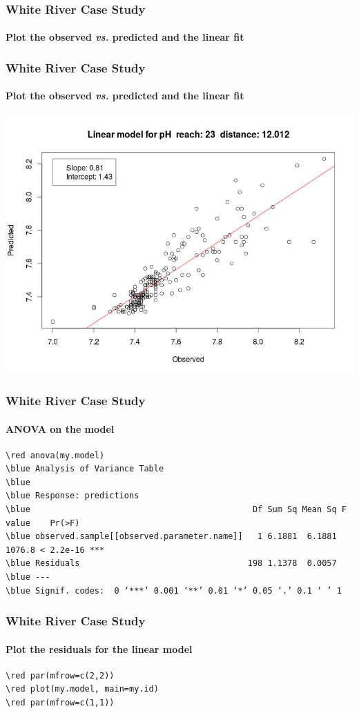\documentclass[10pt]{beamer}
\newcommand{\red}{\color{red}}
\newcommand{\blue}{\color{blue}}
\newcommand{\iwsframe}[2]{
\begin{frame}[fragile]
\frametitle{#1}
\framesubtitle{#2}
}
\begin{document}
\iwsframe{White River Case Study}{Plot the observed {\em vs.}
  predicted and the linear fit}
\VerbatimInput[formatcom=\red,fontsize=\scriptsize,firstline=205,lastline=214]{whiteriver01.r}
\end{frame}

\iwsframe{White River Case Study}{Plot the observed {\em vs.}
  predicted and the linear fit}
\includegraphics[width=\textwidth]{whiteriverplot05.png}
\end{frame}


\iwsframe{White River Case Study}{ANOVA on the model}
\begin{Verbatim}[fontsize=\scriptsize,commandchars=\\\{\}]
\red anova(my.model)
\blue Analysis of Variance Table
\blue 
\blue Response: predictions
\blue                                             Df Sum Sq Mean Sq F value    Pr(>F)    
\blue observed.sample[[observed.parameter.name]]   1 6.1881  6.1881  1076.8 < 2.2e-16 ***
\blue Residuals                                  198 1.1378  0.0057                      
\blue ---
\blue Signif. codes:  0 ‘***’ 0.001 ‘**’ 0.01 ‘*’ 0.05 ‘.’ 0.1 ‘ ’ 1
\end{Verbatim}
\end{frame}

\iwsframe{White River Case Study}{Plot the residuals for the linear model}
\begin{Verbatim}[fontsize=\scriptsize,commandchars=\\\{\}]
\red par(mfrow=c(2,2))
\red plot(my.model, main=my.id)
\red par(mfrow=c(1,1))
\end{Verbatim}
\end{frame}
\end{document}
